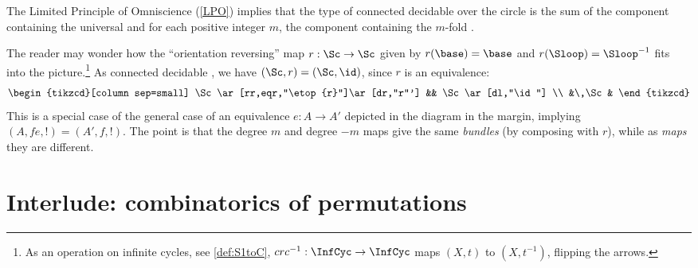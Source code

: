 \begin{lemma}
  \label{lem:componentsofcoversofS1}
  The Limited Principle of Omniscience (\cref{LPO})
  implies that the type of connected decidable \coverings over the circle is the sum
of the component containing the universal \covering and for each positive integer $m$,
the component containing the $m$-fold \covering.
\end{lemma}

\begin{remark}
  \label{rem:flipthecircle}
The reader may wonder how the ``orientation reversing'' map $r:\Sc\to \Sc$ given
by $r(\base)=\base$ and $r(\Sloop)=\Sloop^{-1}$ fits into the picture.\footnote{%
  As an operation on infinite cycles, see \cref{def:S1toC},
  $c r c^{-1} : \InfCyc\to\InfCyc$ maps $(X,t)$ to $(X,t^{-1})$,
  flipping the arrows.}
As connected decidable \coverings, we have
$(\Sc,r) = (\Sc,\id)$, since $r$ is an equivalence:
\[
  \begin{tikzcd}[column sep=small]
    \Sc\ar[rr,eqr,"\etop{r}"]\ar[dr,"r"'] && \Sc\ar[dl,"\id"] \\
    &\,\Sc&
  \end{tikzcd}
\]
This is a special case of the general case of an equivalence
$e: A\to A'$ depicted in the diagram in the margin, implying $(A,fe,!)=(A',f,!)$.
The point is that the degree $m$ and degree $-m$ maps give the same \emph{bundles} (by composing with $r$), while as \emph{maps} they are different.
\end{remark}

\section{Interlude: combinatorics of permutations}

